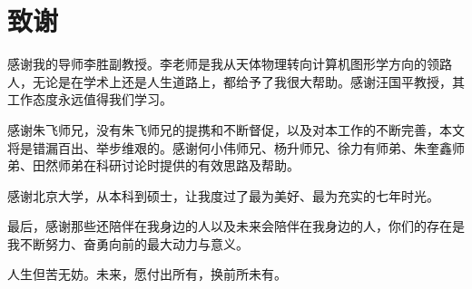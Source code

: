 \chapter{致谢}
感谢我的导师李胜副教授。李老师是我从天体物理转向计算机图形学方向的领路人，无论是在学术上还是人生道路上，都给予了我很大帮助。感谢汪国平教授，其工作态度永远值得我们学习。

感谢朱飞师兄，没有朱飞师兄的提携和不断督促，以及对本工作的不断完善，本文将是错漏百出、举步维艰的。感谢何小伟师兄、杨升师兄、徐力有师弟、朱奎鑫师弟、田然师弟在科研讨论时提供的有效思路及帮助。

感谢北京大学，从本科到硕士，让我度过了最为美好、最为充实的七年时光。

最后，感谢那些还陪伴在我身边的人以及未来会陪伴在我身边的人，你们的存在是我不断努力、奋勇向前的最大动力与意义。

人生但苦无妨。未来，愿付出所有，换前所未有。
